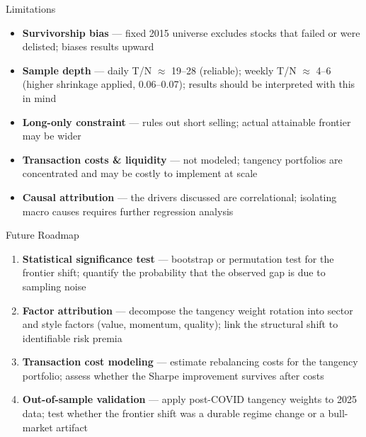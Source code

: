 \documentclass[aspectratio=169]{beamer}
\begin{document}
\begin{frame}{Limitations}
  \begin{itemize}
    \item \textbf{Survivorship bias} --- fixed 2015 universe excludes stocks that failed or were delisted; biases results upward
    \item \textbf{Sample depth} --- daily T/N $\approx$ 19--28 (reliable); weekly T/N $\approx$ 4--6 (higher shrinkage applied, 0.06--0.07); results should be interpreted with this in mind
    \item \textbf{Long-only constraint} --- rules out short selling; actual attainable frontier may be wider
    \item \textbf{Transaction costs \& liquidity} --- not modeled; tangency portfolios are concentrated and may be costly to implement at scale
    \item \textbf{Causal attribution} --- the drivers discussed are correlational; isolating macro causes requires further regression analysis
  \end{itemize}
\end{frame}

\begin{frame}{Future Roadmap}
  \begin{enumerate}
    \item \textbf{Statistical significance test} --- bootstrap or permutation test for the frontier shift; quantify the probability that the observed gap is due to sampling noise
    \vspace{0.4em}
    \item \textbf{Factor attribution} --- decompose the tangency weight rotation into sector and style factors (value, momentum, quality); link the structural shift to identifiable risk premia
    \vspace{0.4em}
    \item \textbf{Transaction cost modeling} --- estimate rebalancing costs for the tangency portfolio; assess whether the Sharpe improvement survives after costs
    \vspace{0.4em}
    \item \textbf{Out-of-sample validation} --- apply post-COVID tangency weights to 2025 data; test whether the frontier shift was a durable regime change or a bull-market artifact
  \end{enumerate}
\end{frame}
\end{document}
